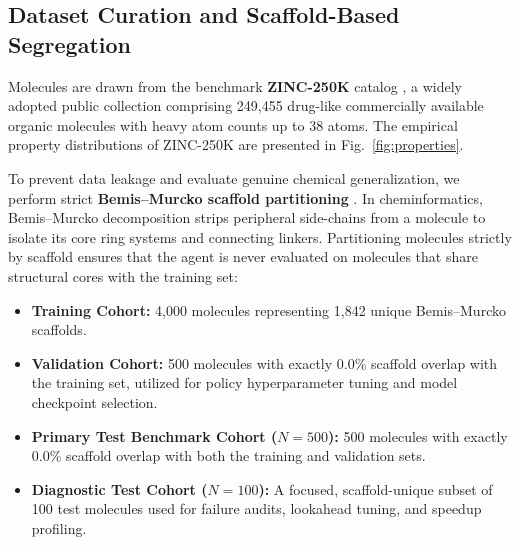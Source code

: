 \documentclass{ieeeaccess}
\begin{document}
\subsection{Dataset Curation and Scaffold-Based Segregation}
Molecules are drawn from the benchmark \textbf{ZINC-250K} catalog \cite{irwin2005}, a widely adopted public collection comprising 249,455 drug-like commercially available organic molecules with heavy atom counts up to 38 atoms. The empirical property distributions of ZINC-250K are presented in Fig.~\ref{fig:properties}.

To prevent data leakage and evaluate genuine chemical generalization, we perform strict \textbf{Bemis--Murcko scaffold partitioning} \cite{bemis1996}. In cheminformatics, Bemis--Murcko decomposition strips peripheral side-chains from a molecule to isolate its core ring systems and connecting linkers. Partitioning molecules strictly by scaffold ensures that the agent is never evaluated on molecules that share structural cores with the training set:
\begin{itemize}
    \item \textbf{Training Cohort:} 4,000 molecules representing 1,842 unique Bemis--Murcko scaffolds.
    \item \textbf{Validation Cohort:} 500 molecules with exactly 0.0\% scaffold overlap with the training set, utilized for policy hyperparameter tuning and model checkpoint selection.
    \item \textbf{Primary Test Benchmark Cohort ($N=500$):} 500 molecules with exactly 0.0\% scaffold overlap with both the training and validation sets.
    \item \textbf{Diagnostic Test Cohort ($N=100$):} A focused, scaffold-unique subset of 100 test molecules used for failure audits, lookahead tuning, and speedup profiling.
\end{itemize}
\end{document}
